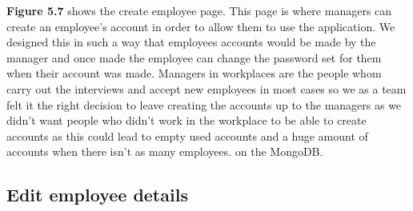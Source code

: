 \textbf{Figure 5.7} shows the create employee page. This page is where managers can create an employee’s account in order to allow them to use the application. We designed this in such a way that employees accounts would be made by the manager and once made the employee can change the password set for them when their account was made. Managers in workplaces are the people whom carry out the interviews and accept new employees in most cases so we as a team felt it the right decision to leave creating the accounts up to the managers as we didn’t want people who didn’t work in the workplace to be able to create accounts as this could lead to empty used accounts and a huge amount of accounts when there isn’t as many employees. on the MongoDB.
\FloatBarrier

\subsection{Edit employee details}
